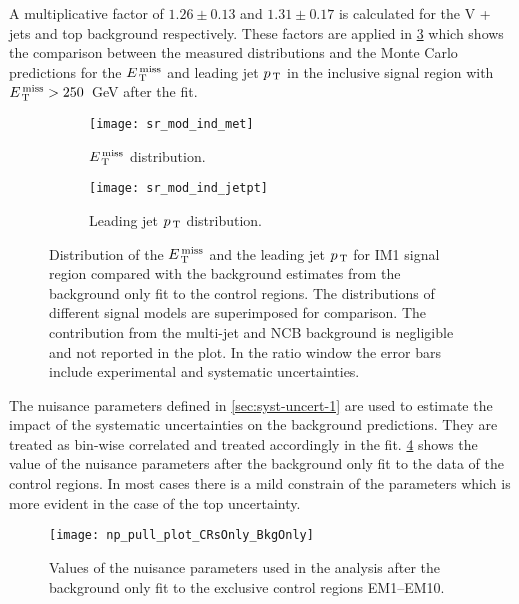A multiplicative factor of $1.26 \pm 0.13$ and $1.31 \pm 0.17$ is calculated for
the V + jets and top background respectively. These factors are applied in
\cref{fig:sr_plots_2016} which shows the comparison between the measured
distributions and the Monte Carlo predictions for the $E_\mathrm{\, T}^\mathrm{\, miss}$ and leading jet
$p_\mathrm{\, T}$ in the inclusive signal region with $E_\mathrm{\, T}^\mathrm{\, miss} > 250$~GeV after the fit.
\begin{figure}[!htb]
  \centering
  \begin{subfigure}[t]{.48\linewidth}
    \texttt{[image: sr\_mod\_ind\_met]}
    \caption{$E_\mathrm{\, T}^\mathrm{\, miss}$ distribution.}
    \label{fig:sr_et_miss_2016}
  \end{subfigure}
  \begin{subfigure}[t]{.48\linewidth}
    \texttt{[image: sr\_mod\_ind\_jetpt]}
    \caption{Leading jet $p_\mathrm{\, T}$ distribution.}
    \label{fig:sr_jet1_pt_2016}
  \end{subfigure}
  \caption{Distribution of the $E_\mathrm{\, T}^\mathrm{\, miss}$ and the leading jet $p_\mathrm{\, T}$ for IM1 signal
    region compared with the background estimates from the background only fit
    to the control regions. The distributions of different signal models are
    superimposed for comparison. The contribution from the multi-jet and NCB
    background is negligible and not reported in the plot. In the ratio window
    the error bars include experimental and systematic uncertainties.}
  \label{fig:sr_plots_2016}
\end{figure}

The nuisance parameters defined in \cref{sec:syst-uncert-1} are used to estimate
the impact of the systematic uncertainties on the background predictions. They
are treated as bin-wise correlated and treated accordingly in the
fit. \cref{fig:np_pull} shows the value of the nuisance parameters after the
background only fit to the data of the control regions. In most cases there is a
mild constrain of the parameters which is more evident in the case of the top
uncertainty.
\begin{figure}[!htb]
  \centering
  \texttt{[image: np\_pull\_plot\_CRsOnly\_BkgOnly]}
  \caption{Values of the nuisance parameters used in the analysis after the
    background only fit to the exclusive control regions EM1--EM10.}
  \label{fig:np_pull}
\end{figure}

